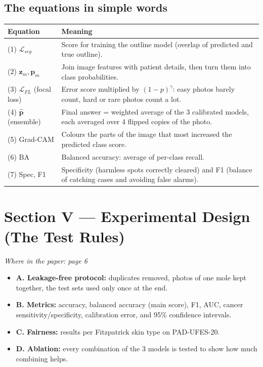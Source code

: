 \documentclass[11pt,a4paper]{article}
\newcommand{\where}[1]{{\small\color{hcGray}\textit{Where in the paper: #1}}\par\smallskip}
\begin{document}
\subsection*{The equations in simple words}
\par\smallskip
\begin{tabularx}{\linewidth}{@{}L{2.6cm} Y@{}}
\toprule
\textbf{Equation} & \textbf{Meaning} \\
\midrule
(1) $\mathcal{L}_{seg}$ & Score for training the outline model (overlap of predicted and true outline). \\
(2) $\mathbf{z}_m, \mathbf{p}_m$ & Join image features with patient details, then turn them into class probabilities. \\
(3) $\mathcal{L}_{FL}$ (focal loss) & Error score multiplied by $(1-p)^{\gamma}$: easy photos barely count, hard or rare photos count a lot. \\
(4) $\hat{\mathbf{p}}$ (ensemble) & Final answer = weighted average of the 3 calibrated models, each averaged over 4 flipped copies of the photo. \\
(5) Grad-CAM & Colours the parts of the image that most increased the predicted class score. \\
(6) BA & Balanced accuracy: average of per-class recall. \\
(7) Spec, F1 & Specificity (harmless spots correctly cleared) and F1 (balance of catching cases and avoiding false alarms). \\
\bottomrule
\end{tabularx}

\section{Section V --- Experimental Design (The Test Rules)}
\where{page 6}
\begin{itemize}
  \item \textbf{A. Leakage-free protocol:} duplicates removed, photos of one
        mole kept together, the test sets used only once at the end.
  \item \textbf{B. Metrics:} accuracy, balanced accuracy (main score),
        F1, AUC, cancer sensitivity/specificity, calibration error, and
        95\% confidence intervals.
  \item \textbf{C. Fairness:} results per Fitzpatrick skin type on
        PAD-UFES-20.
  \item \textbf{D. Ablation:} every combination of the 3 models is tested
        to show how much combining helps.
\end{itemize}
\end{document}
